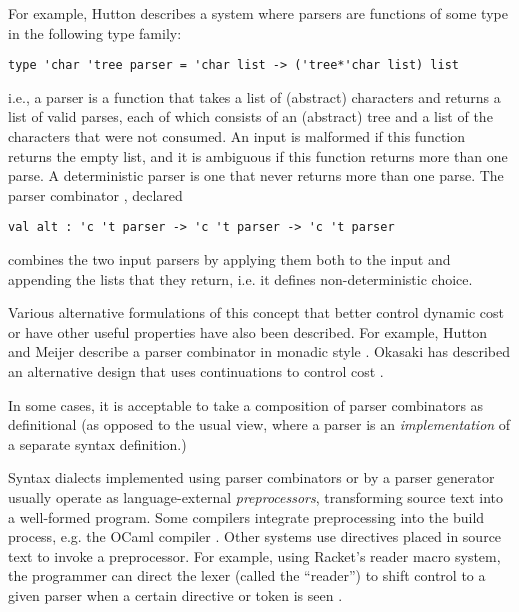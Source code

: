 For example, Hutton describes a system where parsers are functions of some type in the following type family:%
\begin{lstlisting}[numbers=none]
type 'char 'tree parser = 'char list -> ('tree*'char list) list
\end{lstlisting}
i.e., a parser is a function that takes a list of (abstract) characters and returns a list of valid parses, each of which consists of an (abstract) tree and a list of the characters that were not consumed. An input is malformed if this function returns the empty list, and it is ambiguous if this function returns more than one parse. A deterministic parser is one that never returns more than one parse. The parser combinator , declared 
\begin{lstlisting}[numbers=none]
val alt : 'c 't parser -> 'c 't parser -> 'c 't parser
\end{lstlisting}
combines the two input parsers by applying them both to the input and appending the lists that they return, i.e. it defines non-deterministic choice.

Various alternative formulations of this concept that better control dynamic cost or have other useful properties have also been described. For example, Hutton and Meijer describe a parser combinator in monadic style \cite{hutton1998monadic}. Okasaki has described an alternative design that uses continuations to control cost \cite{Okasaki98b}.

In some cases, it is acceptable to take a composition of parser combinators as definitional (as opposed to the usual view, where a parser is an \emph{implementation} of a separate syntax definition.)

Syntax dialects implemented using parser combinators or by a {parser generator} usually operate as language-external \emph{preprocessors}, transforming source text into a well-formed program. Some compilers integrate preprocessing into the build process, e.g. the OCaml compiler \cite{ocaml-manual}. Other systems use directives placed in source text to invoke a preprocessor. For example, using Racket's reader macro system, the programmer can direct the lexer (called the ``reader'') to shift control to a given parser when a certain directive or token is seen \cite{Flatt:2012:CLR:2063176.2063195}.


